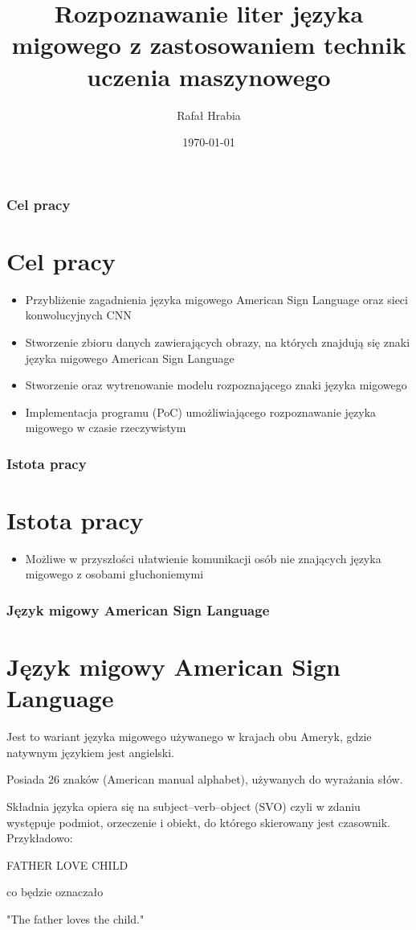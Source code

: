\documentclass{beamer}
\title[]{Rozpoznawanie liter języka migowego z zastosowaniem technik uczenia maszynowego}
\institute[UMCS]
{
	Uniwersytet Marii Curie Skłodowskiej
	\medskip
}
\author{Rafał Hrabia}
\date{\today}
\begin{document}
	\begin{frame}
		\titlepage
	\end{frame}
	\begin{frame}
		\frametitle{Cel pracy}
		\section{Cel pracy}
		\begin{itemize}
			\item Przybliżenie zagadnienia języka migowego American Sign Language oraz sieci konwolucyjnych CNN
			\item Stworzenie zbioru danych zawierających obrazy, na których znajdują się znaki języka migowego American Sign Language
			\item Stworzenie oraz wytrenowanie modelu rozpoznającego znaki języka migowego
			\item Implementacja programu (PoC) umożliwiającego rozpoznawanie języka migowego w czasie rzeczywistym
		\end{itemize}
	\end{frame}

	\begin{frame}
		\frametitle{Istota pracy}
		\section{Istota pracy}
		\begin{itemize}
			\item Możliwe w przyszłości ułatwienie komunikacji osób nie znających języka migowego z osobami głuchoniemymi
		\end{itemize}
	\end{frame}

	\begin{frame}
		\frametitle{Język migowy American Sign Language}
		\section{Język migowy American Sign Language}
		Jest to wariant języka migowego używanego w krajach obu Ameryk, gdzie natywnym językiem jest angielski.\cite{padden}
		
		Posiada 26 znaków (American manual alphabet), używanych do wyrażania słów.\cite{costello}
		
		Składnia języka opiera się na subject–verb–object (SVO) czyli w zdaniu występuje podmiot, orzeczenie i obiekt, do którego skierowany jest czasownik.\cite{neidle} Przykładowo:
		\begin{center}
			FATHER LOVE CHILD
			
			co będzie oznaczało
			
			"The father loves the child."
		\end{center}
	\end{frame}
\end{document}
